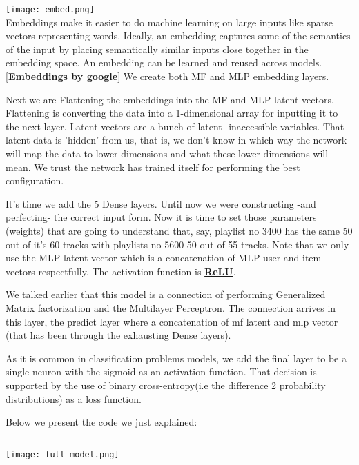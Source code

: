 \documentclass[]{article}
\begin{document}
\texttt{[image: embed.png]}
\\
 Embeddings make it easier to do machine learning on large inputs like sparse vectors representing words. Ideally, an embedding captures some of the semantics of the input by placing semantically similar inputs close together in the embedding space. An embedding can be learned and reused across models. [\href{https://developers.google.com/machine-learning/crash-course/embeddings/video-lecture}{\textbf{Embeddings by google}}] We create both MF and MLP embedding layers.

Next we are Flattening the embeddings into the MF and MLP latent vectors. Flattening is converting the data into a 1-dimensional array for inputting it to the next layer. Latent vectors are a bunch of latent- inaccessible variables.
That latent data is 'hidden' from us, that is, we don't know in which way the network will map the data to lower dimensions and what these lower dimensions will mean. We trust the network has trained itself for performing the best configuration.

It's time we add the 5 Dense layers. Until now we were constructing -and perfecting- the correct input form. Now it is time to set those parameters (weights) that are going to understand that, say, playlist no 3400 has the same 50 out of it's 60 tracks with playlists no 5600 50 out of 55 tracks. Note that we only use the MLP latent vector which is a concatenation of MLP user and item vectors respectfully. The activation function is \href{https://towardsdatascience.com/activation-functions-neural-networks-1cbd9f8d91d6#:~:text=ReLU%20(Rectified%20Linear%20Unit)%20Activation%20Function}{\textbf{ReLU}}. 

We talked earlier that this model is a connection of performing Generalized Matrix factorization and the Multilayer Perceptron. The connection arrives in this layer, the predict layer where a concatenation of mf latent and mlp vector (that has been through the exhausting Dense layers). 

As it is common in classification problems models, we add the final layer to be a single neuron with the sigmoid as an activation function. That decision is supported by the use of binary cross-entropy(i.e the difference 2 probability distributions) as a loss function.

Below we present the code we just explained:
\\
\noindent
{\color{Blue} \rule{\linewidth}{0.5mm}}
\texttt{[image: full\_model.png]}
\end{document}
